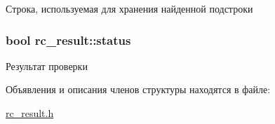 Строка, используемая для хранения найденной подстроки 

\subsubsection[{\texorpdfstring{status}{status}}]{\setlength{\rightskip}{0pt plus 5cm}bool rc\+\_\+result\+::status}\hypertarget{structrc__result_ab0d0340122026893c6b5fb577e71b015}{}\label{structrc__result_ab0d0340122026893c6b5fb577e71b015}


Результат проверки 



Объявления и описания членов структуры находятся в файле\+:\begin{DoxyCompactItemize}
\item 
\hyperlink{rc__result_8h}{rc\+\_\+result.\+h}\end{DoxyCompactItemize}
